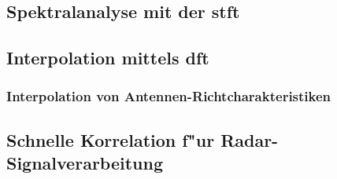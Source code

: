 \subsection{Spektralanalyse mit der \texorpdfstring{\acrlong*{stft}}{STFT}}\label{sec:stft}
%

%
\subsection{Interpolation mittels \texorpdfstring{\acrshort*{dft}}{DFT}}\label{sec:dftintp}
%

%
\subsubsection{Interpolation von Antennen-Richtcharakteristiken}\label{sec:eadf}
%

%
\subsection{Schnelle Korrelation f"ur Radar-Signalverarbeitung}\label{sec:mseq}
%
